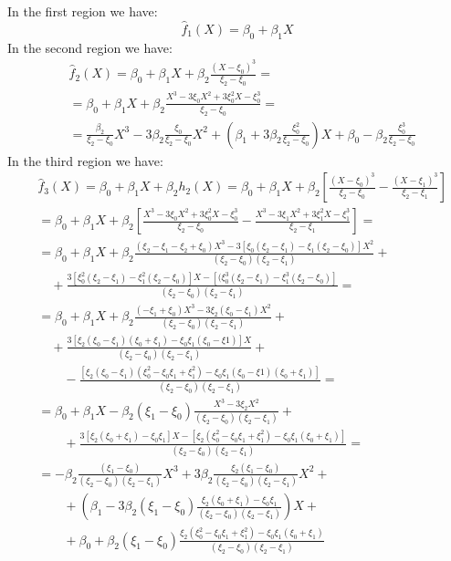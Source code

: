 \documentclass[12pt, letterpaper]{article}
\theoremstyle{definition}
\begin{document}
In the first region we have:
\begin{equation}
\hat{f}_1(X) = \beta_0 + \beta_1 X
\end{equation}
In the second region we have:
\begin{equation}
\begin{aligned}
&\hat{f}_2(X) = \beta_0 + \beta_1 X +\beta_2 \frac{(X-\xi_0)^3}{\xi_2 - \xi_0} =\\
&= \beta_0 + \beta_1 X +\beta_2 \frac{X^3 -3 \xi_0 X^2 + 3\xi_0^2 X-\xi_0^3}{\xi_2 - \xi_0} =\\
&= \frac{\beta_2}{\xi_2 - \xi_0} X^3 -3 \beta_2\frac{\xi_0}{\xi_2 - \xi_0} X^2 + (\beta_1+3\beta_2\frac{\xi_0^2}{\xi_2 - \xi_0})X + \beta_0 - \beta_2\frac{\xi_0^3}{\xi_2 - \xi_0}
\end{aligned}
\end{equation}
In the third region we have:
\begin{equation}
\begin{aligned}
&\hat{f}_3(X) = \beta_0 + \beta_1 X  +\beta_2 h_2(X) = \beta_0 + \beta_1 X  +\beta_2\left[ \frac{(X-\xi_0)^3}{\xi_2 - \xi_0} - \frac{(X-\xi_1)^3}{\xi_2 - \xi_1}\right]  \\
&= \beta_0 + \beta_1 X +\beta_2 \left[ \frac{X^3 -3 \xi_0 X^2 + 3\xi_0^2 X-\xi_0^3}{\xi_2 - \xi_0} -  \frac{X^3 -3 \xi_1 X^2 + 3\xi_1^2 X-\xi_1^3}{\xi_2 - \xi_1}\right] =\\
&= \beta_0 + \beta_1 X +\beta_2 \frac{(\xi_2-\xi_1-\xi_2+\xi_0)X^3-3\left[ \xi_0(\xi_2-\xi_1) - \xi_1(\xi_2-\xi_0)\right]X^2}{(\xi_2 - \xi_0)(\xi_2 - \xi_1)}+\\
&\quad +  \frac{3\left[\xi_0^2(\xi_2-\xi_1) - \xi_1^2(\xi_2-\xi_0) \right]X-\left[(\xi_0^3(\xi_2-\xi_1) -\xi_1^3(\xi_2-\xi_0)\right]}{(\xi_2 - \xi_0)(\xi_2 - \xi_1)}=\\
&=  \beta_0 + \beta_1 X +\beta_2 \frac{(-\xi_1+\xi_0)X^3-3\xi_2(\xi_0-\xi_1)X^2}{(\xi_2 - \xi_0)(\xi_2 - \xi_1)}+\\
&\quad +  \frac{3\left[\xi_2(\xi_0-\xi_1)(\xi_0+\xi_1)-\xi_0\xi_1(\xi_0-\xi1)\right]X}{(\xi_2 - \xi_0)(\xi_2 - \xi_1)}+\\
&\quad\quad-\frac{\left[\xi_2(\xi_0-\xi_1)(\xi_0^2-\xi_0\xi_1+\xi_1^2)-\xi_0\xi_1(\xi_0-\xi1)(\xi_0+\xi_1)\right]}{(\xi_2 - \xi_0)(\xi_2 - \xi_1)} = \\
&=\beta_0 + \beta_1 X -\beta_2 (\xi_1-\xi_0)\frac{X^3-3\xi_2X^2}{(\xi_2 - \xi_0)(\xi_2 - \xi_1)}+\\
&\quad\quad +  \frac{3\left[\xi_2(\xi_0+\xi_1)-\xi_0\xi_1\right]X-\left[\xi_2(\xi_0^2-\xi_0\xi_1+\xi_1^2)-\xi_0\xi_1(\xi_0+\xi_1)\right]}{(\xi_2 - \xi_0)(\xi_2 - \xi_1)}=\\
&= -\beta_2\frac{(\xi_1-\xi_0)}{(\xi_2 - \xi_0)(\xi_2 - \xi_1)} X^3 +3 \beta_2\frac{\xi_2(\xi_1-\xi_0)}{(\xi_2 - \xi_0)(\xi_2 - \xi_1)} X^2 + \\
&\quad\quad +(\beta_1-3\beta_2(\xi_1-\xi_0)\frac{\xi_2(\xi_0+\xi_1)-\xi_0\xi_1}{(\xi_2 - \xi_0)(\xi_2 - \xi_1)})X +\\
&\quad\quad+ \beta_0 + \beta_2(\xi_1-\xi_0)\frac{\xi_2(\xi_0^2-\xi_0\xi_1+\xi_1^2)-\xi_0\xi_1(\xi_0+\xi_1)}{(\xi_2 - \xi_0)(\xi_2 - \xi_1)}
\end{aligned}
\end{equation}
\end{document}
